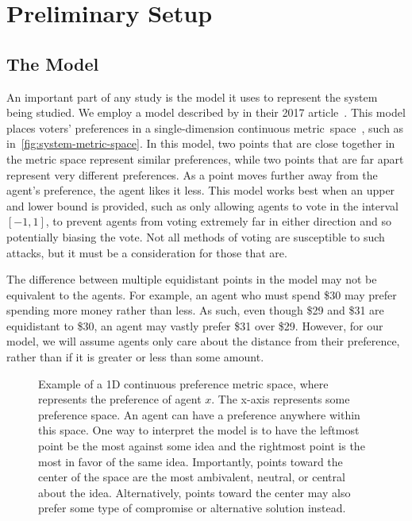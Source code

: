 \section{Preliminary Setup}\label{sec:preliminary-setup}

\subsection{The Model}\label{subsec:the-model}
An important part of any study is the model it uses to represent the system being
studied.
We employ a model described by  in their 2017
article~\cite{Cohensius2017}.
This model places voters' preferences in a single-dimension continuous
metric~space~\systemspace, such as in~\autoref{fig:system-metric-space}.
In this model, two points that are close together in the metric space represent
similar preferences, while two points that are far apart represent very different
preferences.
As a point moves further away from the agent's preference, the agent likes it less.
This model works best when an upper and lower bound is provided, such as only
allowing agents to vote in the interval $[-1, 1]$, to prevent agents from voting
extremely far in either direction and so potentially biasing the vote.
Not all methods of voting are susceptible to such attacks, but it must be a
consideration for those that are.

The difference between multiple equidistant points in the model may not be equivalent
to the agents.
For example, an agent who must spend \$30 may prefer spending more money rather than
less.
As such, even though \$29 and \$31 are equidistant to \$30, an agent may vastly
prefer \$31 over \$29.
However, for our model, we will assume agents only care about the distance from their
preference, rather than if it is greater or less than some amount.

\begin{figure}[htbp]
    \centering
    
    \caption{
        Example of a 1D continuous preference metric space, where  represents
        the preference of agent $x$.
        The x-axis represents some preference space.
        An agent can have a preference anywhere within this space.
        One way to interpret the model is to have the leftmost point be the most
        against some idea and the rightmost point is the most in favor of the same idea.
        Importantly, points toward the center of the space are the most ambivalent,
        neutral, or central about the idea.
        Alternatively, points toward the center may also prefer some type of
        compromise or alternative solution instead.
    }
    \label{fig:system-metric-space}
\end{figure}

